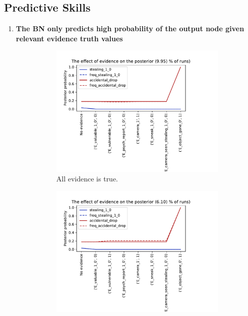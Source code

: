 \subsection{Predictive Skills}
\begin{enumerate}
\item \textbf{The BN only predicts high probability of the output node given relevant evidence truth values}

\begin{figure}[htbp]
\begin{center}
\begin{subfigure}{.66\textwidth}
\includegraphics[width=\linewidth]{../experiments/GroteMarkt/plots/evidence_progress_GroteMarkt_2.pdf}
\caption{All evidence is true.}
\label{default}
\end{subfigure}%
\begin{subfigure}{.66\textwidth}
\includegraphics[width=\linewidth]{../experiments/GroteMarkt/plots/evidence_progress_GroteMarkt_1.pdf}

\end{subfigure}
\end{center}
\end{figure}
\end{enumerate}
